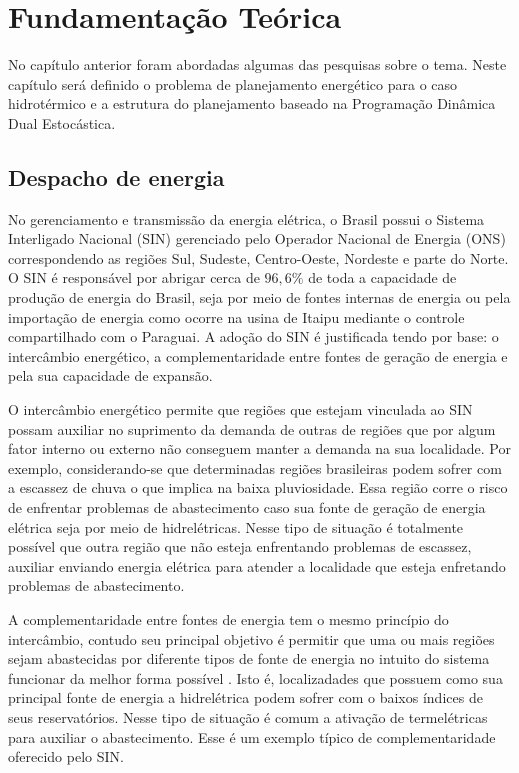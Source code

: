 \chapter{Fundamenta\c c\~ao Te\'orica}
No cap\'itulo anterior foram abordadas algumas das pesquisas sobre o tema. Neste cap\'itulo ser\'a definido o
problema de planejamento energ\'etico para o caso hidrot\'ermico e a estrutura do planejamento baseado na Programa\c c\~ao
Din\^amica Dual Estoc\'astica.
\section{Despacho de energia}
No gerenciamento e transmiss\~ao da energia el\'etrica, o Brasil possui o Sistema Interligado Nacional
(SIN)
gerenciado pelo Operador Nacional de Energia (ONS)
 correspondendo as regi\~oes Sul, Sudeste, Centro-Oeste, Nordeste e parte do Norte. O SIN \'e respons\'avel por abrigar cerca de
$96,6\%$ de toda a capacidade de produ\c c\~ao de energia do Brasil, seja por meio de fontes internas de energia
ou pela importa\c c\~ao de energia como ocorre na usina de Itaipu mediante o controle compartilhado com o
Paraguai\cite{an}. A ado\c c\~ao do SIN \'e justificada tendo por base: o interc\^ambio energ\'etico, a
complementaridade entre fontes de gera\c c\~ao de energia e pela sua capacidade de expans\~ao.

O interc\^ambio energ\'etico permite que regi\~oes que estejam vinculada ao SIN possam auxiliar no suprimento da
demanda de outras de regi\~oes que por algum fator interno ou externo n\~ao conseguem manter a demanda na sua localidade\cite{an}. Por
exemplo, considerando-se que determinadas regi\~oes brasileiras podem sofrer com a escassez de chuva o que implica na
baixa pluviosidade. Essa regi\~ao corre o risco de enfrentar problemas de abastecimento caso sua fonte de gera\c c\~ao
de energia el\'etrica seja por meio de hidrel\'etricas. Nesse tipo de situa\c c\~ao \'e totalmente poss\'ivel que outra
regi\~ao que n\~ao esteja enfrentando problemas de escassez, auxiliar enviando energia el\'etrica para atender a
localidade que esteja enfretando problemas de abastecimento. 

A complementaridade entre fontes de energia tem o mesmo princ\'ipio do interc\^ambio, contudo seu principal objetivo \'e permitir
que uma ou mais regi\~oes sejam abastecidas por diferente tipos de fonte de energia no intuito do sistema funcionar
da melhor forma poss\'ivel \cite{tom}. Isto \'e, localizadades que possuem como sua principal fonte de energia a
hidrel\'etrica podem sofrer com o baixos \'indices de seus reservat\'orios. Nesse tipo de situa\c c\~ao
\'e comum a ativa\c c\~ao de termel\'etricas para auxiliar o abastecimento. Esse \'e um exemplo t\'ipico de
complementaridade oferecido pelo SIN. 


